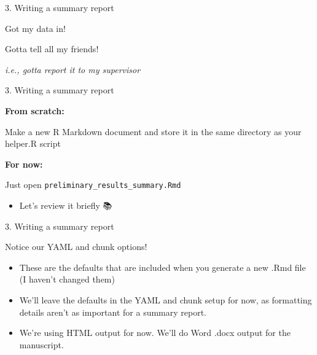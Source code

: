 \documentclass[
  ignorenonframetext,
]{beamer}
\providecommand{\tightlist}{%
  \setlength{\itemsep}{0pt}\setlength{\parskip}{0pt}}
\begin{document}
\begin{frame}[fragile]{3. Writing a summary report}
\protect\hypertarget{writing-a-summary-report}{}

\begin{block}{Got my data in! 💃}

\end{block}

\begin{block}{Gotta tell all my friends! 🎉}

\emph{i.e., gotta report it to my supervisor}

\end{block}

\begin{block}{3. Writing a summary report}

\begin{block}{\textbf{From scratch: }}

Make a new R Markdown document and store it in the same directory as
your helper.R script

\end{block}

\begin{block}{\textbf{For now:}}

Just open \texttt{preliminary\_results\_summary.Rmd}

\begin{itemize}
\tightlist
\item
  Let's review it briefly 📚
\end{itemize}

\end{block}

\end{block}

\begin{block}{3. Writing a summary report}

\begin{block}{Notice our YAML and chunk options!}

\begin{itemize}
\tightlist
\item
  These are the defaults that are included when you generate a new .Rmd
  file (I haven't changed them)
\item
  We'll leave the defaults in the YAML and chunk setup for now, as
  formatting details aren't as important for a summary report.
\item
  We're using HTML output for now. We'll do Word .docx output for the
  manuscript.
\end{itemize}


\end{block}
\end{block}
\end{frame}
\end{document}
